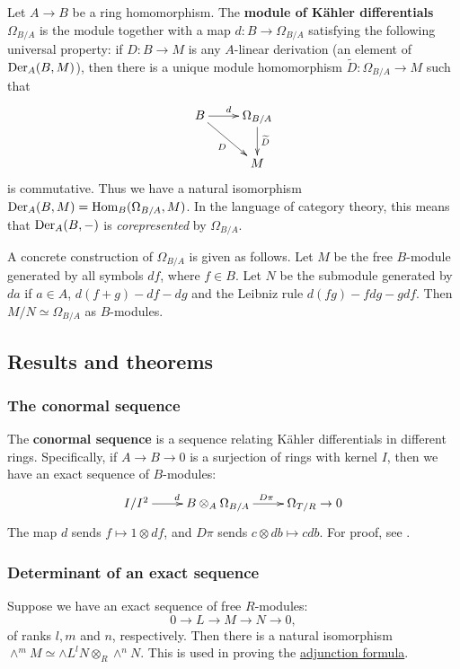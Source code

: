 \documentclass[11pt, english]{article}
\begin{document}
Let $A \to B$ be a ring homomorphism. The \textbf{module of Kähler differentials} $\Omega_{B/A}$ is the module together with a map $d:B \to \Omega_{B/A}$ satisfying the following universal property: if $D:B \to M$ is any $A$-linear derivation (an element of $\operatorname{Der}_A(B,M)$), then there is a unique module homomorphism $\widetilde D:\Omega_{B/A} \to M$ such that
\[
\xymatrix{
B \ar[r]^d  \ar[dr]_D & \Omega_{B/A} \ar[d]^{\widetilde D} \\
 & M
}
\]
is commutative. Thus we have a natural isomorphism $\operatorname{Der}_A(B,M)=\operatorname{Hom}_B(\Omega_{B/A},M)$. In the language of category theory, this means that $\operatorname{Der}_A(B,-)$ is \emph{corepresented} by $\Omega_{B/A}$. 

A concrete construction of $\Omega_{B/A}$ is given as follows. Let $M$ be the free $B$-module generated by all symbols $df$, where $f \in B$. Let $N$ be the submodule generated by $da$ if $a \in A$, $d(f+g)-df-dg$ and the Leibniz rule $d(fg)-fdg-gdf$. Then $M/N \simeq \Omega_{B/A}$ as $B$-modules.

\subsection{Results and theorems}
\subsubsection{The conormal sequence}
\label{conormalsequence}

The \textbf{conormal sequence} is a sequence relating Kähler differentials in different rings. Specifically, if $A \to B \to 0$ is a surjection of rings with kernel $I$, then we have an exact sequence of $B$-modules:
\[
\xymatrix{
I/I^2 \ar[r]^d & B \otimes_A \Omega_{B/A} \ar[r]^{D\pi} & \Omega_{T/R} \to 0
}
\]
The map $d$ sends $f \mapsto 1 \otimes df$, and $D \pi$ sends $c \otimes db \mapsto c db$. For proof, see \cite[Chapter 16]{eisenbud}.

\subsubsection{Determinant of an exact sequence}
\label{determinantsequence}

Suppose we have an exact sequence of free $R$-modules:
\[
0 \to L \to M \to N \to 0,
\]
of ranks $l,m$ and $n$, respectively. Then there is a natural isomorphism $\wedge^m M \simeq \wedge L^l N \otimes_R \wedge^n N$.  This is used in proving the \hyperref[adjunction]{adjunction formula}.
\end{document}
